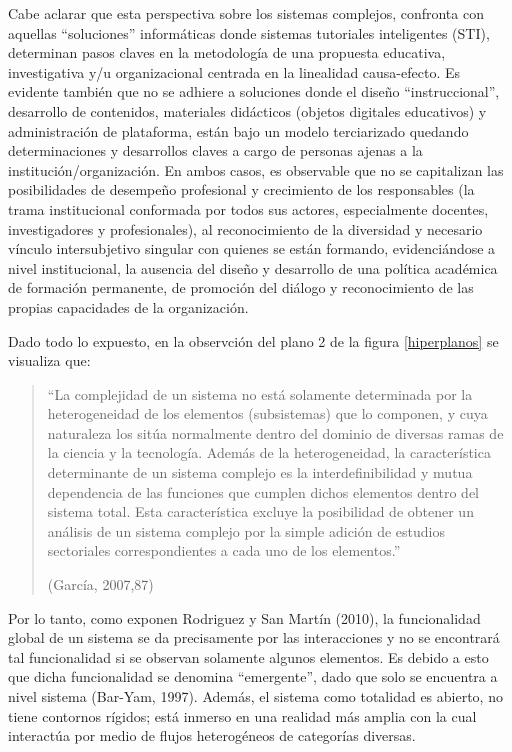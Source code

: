Cabe aclarar que esta perspectiva sobre los sistemas complejos, confronta con
aquellas “soluciones” informáticas donde sistemas tutoriales inteligentes (STI),
determinan pasos claves en la metodología de una propuesta educativa,
investigativa y/u organizacional centrada en la linealidad
causa-efecto. Es evidente también que no se  adhiere  a  soluciones
donde   el  diseño “instruccional”, desarrollo de contenidos, materiales
didácticos (objetos digitales educativos) y administración de plataforma, están bajo
un modelo terciarizado quedando determinaciones y desarrollos claves a cargo
de personas ajenas a la institución/organización. En ambos casos, es observable
que no se capitalizan las posibilidades de desempeño profesional y crecimiento
de los responsables (la trama institucional conformada por todos sus actores,   
especialmente docentes, investigadores y profesionales), al reconocimiento de la
diversidad y necesario vínculo intersubjetivo singular con quienes se están
formando, evidenciándose a nivel institucional, la ausencia del diseño y
desarrollo de una política académica de formación  permanente, de
promoción del diálogo y reconocimiento de las propias capacidades de la
organización.

Dado todo lo expuesto, en la observción del plano 2 de la figura
\ref{hiperplanos} se visualiza que:
     
\begin{quote}
     “La complejidad de un sistema no está solamente determinada por la
     heterogeneidad de los elementos (subsistemas) que lo componen, y cuya
     naturaleza los sitúa normalmente dentro del dominio de diversas ramas de la
     ciencia y la tecnología. Además de la heterogeneidad, la característica
     determinante de un sistema complejo es la interdefinibilidad y mutua
     dependencia de las funciones que cumplen dichos elementos dentro del
     sistema total. Esta característica excluye la posibilidad de obtener
     un análisis de un sistema complejo por la simple adición de estudios
     sectoriales correspondientes a cada uno de los elementos.” 
     \begin{flushright} (García, 2007,87)     \end{flushright}
\end{quote} 

Por lo tanto, como exponen Rodriguez y San Martín (2010), la funcionalidad
global de un sistema se da precisamente por las interacciones y no se encontrará
tal funcionalidad si se observan solamente algunos elementos. Es debido a esto
que dicha funcionalidad se denomina “emergente”, dado que solo se encuentra
a nivel sistema (Bar-Yam, 1997). Además, el sistema como totalidad es abierto,
no tiene contornos rígidos; está inmerso en una realidad más amplia con la cual
interactúa por medio de flujos heterogéneos de categorías diversas.


